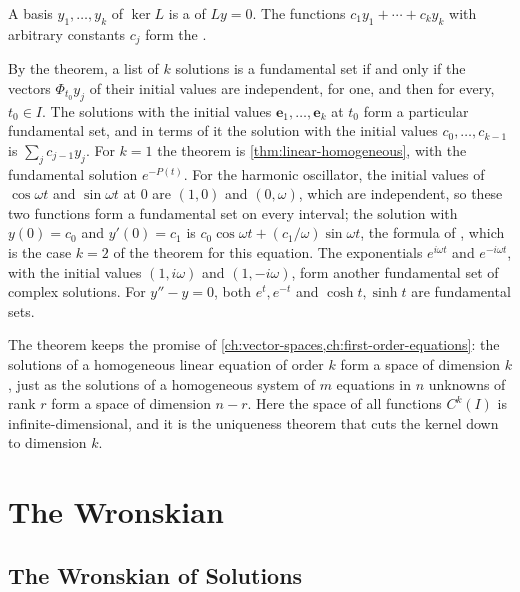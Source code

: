 \begin{definition}
\label{def:fundamental-set}
A basis $y_1,\ldots,y_k$ of $\ker L$ is a  of $Ly=0$. The functions $c_1y_1+\cdots+c_ky_k$ with arbitrary constants $c_j$ form the .
\end{definition}

By the theorem, a list of $k$ solutions is a fundamental set if and only if the vectors $\Phi_{t_0}y_j$ of their initial values are independent, for one, and then for every, $t_0\in I$. The solutions with the initial values $\mathbf e_1,\ldots,\mathbf e_k$ at $t_0$ form a particular fundamental set, and in terms of it the solution with the initial values $c_0,\ldots,c_{k-1}$ is $\sum_jc_{j-1}y_j$. For $k=1$ the theorem is \cref{thm:linear-homogeneous}, with the fundamental solution $e^{-P(t)}$. For the harmonic oscillator, the initial values of $\cos\omega t$ and $\sin\omega t$ at $0$ are $(1,0)$ and $(0,\omega)$, which are independent, so these two functions form a fundamental set on every interval; the solution with $y(0)=c_0$ and $y'(0)=c_1$ is $c_0\cos\omega t+(c_1/\omega)\sin\omega t$, the formula of , which is the case $k=2$ of the theorem for this equation. The exponentials $e^{i\omega t}$ and $e^{-i\omega t}$, with the initial values $(1,i\omega)$ and $(1,-i\omega)$, form another fundamental set of complex solutions. For $y''-y=0$, both $e^t,e^{-t}$ and $\cosh t,\sinh t$ are fundamental sets.

The theorem keeps the promise of \cref{ch:vector-spaces,ch:first-order-equations}: the solutions of a homogeneous linear equation of order $k$ form a space of dimension $k$, just as the solutions of a homogeneous system of $m$ equations in $n$ unknowns of rank $r$ form a space of dimension $n-r$. Here the space of all functions $C^k(I)$ is infinite-dimensional, and it is the uniqueness theorem that cuts the kernel down to dimension $k$.

\section{The Wronskian}
\label{sec:wronskian}

\subsection{The Wronskian of Solutions}

